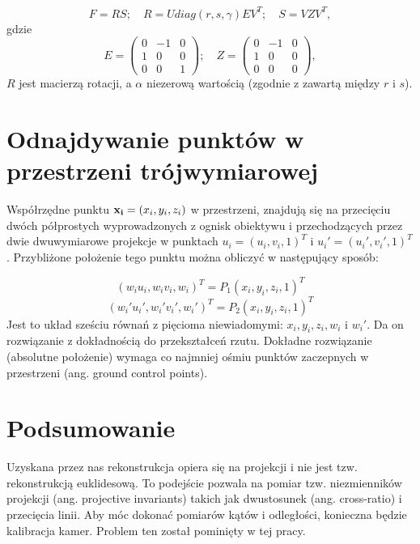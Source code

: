 \begin{equation}
  F = RS;\quad R = Udiag(r,s,\gamma)EV^T;\quad S = VZV^T ,
\end{equation}
gdzie 
\begin{equation}
  E = \begin{pmatrix} 
    0 &-1 & 0 \\
    1 & 0 & 0 \\
    0 & 0 & 1
  \end{pmatrix}
  ;\quad
  Z = \begin{pmatrix} 
    0 &-1 & 0 \\
    1 & 0 & 0 \\
    0 & 0 & 0
  \end{pmatrix},
\end{equation}
$R$ jest macierzą rotacji, a $\alpha$ niezerową wartością (zgodnie z
\cite{stereo} zawartą między $r$ i $s$).

\section{Odnajdywanie punktów w przestrzeni trójwymiarowej}

Współrzędne punktu ${\bf x_i} = (x_i, y_i, z_i) $ w przestrzeni, znajdują się
na przecięciu dwóch półprostych wyprowadzonych z ognisk obiektywu i
przechodzących przez dwie dwuwymiarowe projekcje w punktach $u_i = (u_i, v_i, 1)^T$ i
$u_i\prime = (u_i\prime, v_i\prime, 1)^T$. Przybliżone położenie tego punktu
można obliczyć w następujący sposób: 

\begin{equation} (w_i u_i, w_i v_i, w_i)^T = P_1(x_i, y_i, z_i, 1)^T
\end{equation} \begin{equation} (w_i\prime u_i\prime, w_i\prime v_i\prime,
  w_i\prime)^T = P_2(x_i, y_i, z_i, 1)^T \end{equation} Jest to układ sześciu
  równań z pięcioma niewiadomymi: $x_i, y_i, z_i, w_i$ i $w_i\prime$. Da on
  rozwiązanie z dokładnością do przekształceń rzutu.  Dokładne rozwiązanie
  (absolutne położenie) wymaga co najmniej ośmiu punktów zaczepnych w
  przestrzeni (ang. ground control points).

\section{Podsumowanie}

Uzyskana przez nas rekonstrukcja opiera się na projekcji i nie jest tzw.
rekonstrukcją euklidesową. To podejście pozwala na pomiar tzw. niezmienników
projekcji (ang. projective invariants) takich jak dwustosunek (ang.
cross-ratio) i przecięcia linii. Aby móc dokonać pomiarów kątów i odległości,
konieczna będzie kalibracja kamer. Problem ten został pominięty w tej pracy.
